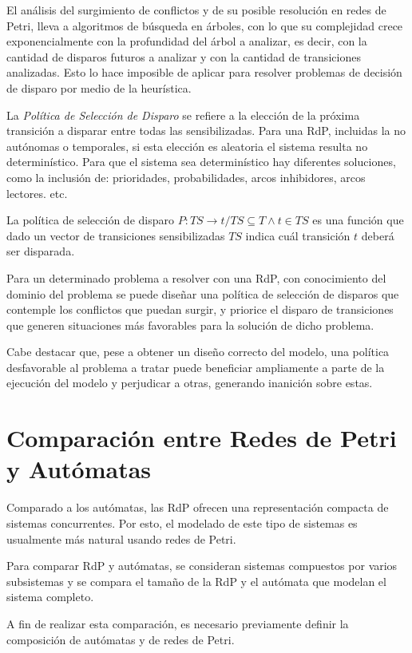 El análisis del surgimiento de conflictos y de su posible resolución en redes de
Petri, lleva a algoritmos de búsqueda en árboles, con lo que su complejidad
crece exponencialmente con la profundidad del árbol a analizar, es decir, con
la cantidad de disparos futuros a analizar y con la cantidad de transiciones
analizadas. Esto lo hace imposible de aplicar para resolver problemas de
decisión de disparo por medio de la heurística.

La \textit{Política de Selección de Disparo} se refiere a la elección de la
próxima transición a disparar entre todas las sensibilizadas. Para una RdP,
incluidas la no autónomas o temporales, si esta elección es aleatoria el sistema
resulta no determinístico. Para que el sistema sea determinístico hay diferentes
soluciones, como la inclusión de: prioridades, probabilidades, arcos
inhibidores, arcos lectores. etc. \cite{Ecuacion_generalizada_LAC}

La política de selección de disparo $P : TS \rightarrow t \slash TS \subseteq T
\land t \in TS $ es una función que dado un vector de transiciones
sensibilizadas $TS$ indica cuál transición $t$ deberá ser disparada.

Para un determinado problema a resolver con una RdP, con conocimiento del
dominio del problema se puede diseñar una política de selección de disparos que
contemple los conflictos que puedan surgir, y priorice el disparo de
transiciones que generen situaciones más favorables para la solución de dicho
problema.

Cabe destacar que, pese a obtener un diseño correcto del modelo, una política
desfavorable al problema a tratar puede beneficiar ampliamente a parte de la
ejecución del modelo y perjudicar a otras, generando inanición sobre estas.


\section{Comparación entre Redes de Petri y Autómatas}

Comparado a los autómatas, las RdP ofrecen una representación compacta de
sistemas concurrentes. Por esto, el modelado de este tipo de sistemas es
usualmente más natural usando redes de Petri. \cite{Iordache:2006:SCC:1197724}

Para comparar RdP y autómatas, se consideran sistemas compuestos por varios
subsistemas y se compara el tamaño de la RdP y el autómata que modelan el
sistema completo.

A fin de realizar esta comparación, es necesario previamente definir la
composición de autómatas y de redes de Petri.\cite{Iordache:2006:SCC:1197724}

